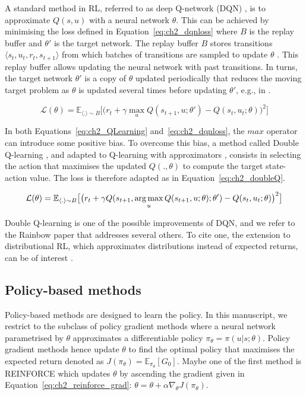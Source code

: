 A standard method in RL, referred to as deep Q-network (DQN) \citep{Mnih2015}, is to approximate $Q(s, u)$ with a neural network $\theta$.
This can be achieved by minimising the loss defined in Equation~\ref{eq:ch2_dqnloss} where $B$ is the replay buffer and $\theta'$ is the target network.
The replay buffer $B$ stores transitions $\langle s_{t},u_{t},r_{t},s_{t+1}\rangle$ from which batches of transitions are sampled to update $\theta$ \citep{lin1992self}.
This replay buffer allows updating the neural network with past transitions.
In turns, the target network $\theta'$ is a copy of $\theta$ updated periodically that reduces the moving target problem as $\theta$ is updated several times before updating $\theta'$, e.g., in \citep{Mnih2015}.

\begin{equation}
\label{eq:ch2_dqnloss}
    \mathcal{L}(\theta) = \mathbb{E}_{\langle . \rangle\sim B} \big[\big(r_{t} + \gamma \max_u Q(s_{t+1}, u; \theta')- Q(s_{t}, u_{t}; \theta)\big)^{2}\big]
\end{equation}

In both Equations~\ref{eq:ch2_QLearning} and~\ref{eq:ch2_dqnloss}, the $max$ operator can introduce some positive bias. 
To overcome this bias, a method called Double Q-learning \citep{hasselt2010double}, and adapted to Q-learning with approximators \citep{van2016deep}, consists in selecting the action that maximises the updated $Q(., \theta)$ to compute the target state-action value.
The loss is therefore adapted as in Equation~\ref{eq:ch2_doubleQ}.

\begin{equation}
    \label{eq:ch2_doubleQ}
    \mathcal{L}(\theta) = \mathbb{E}_{\langle . \rangle\sim B} \big[\big(r_{t} + \gamma Q(s_{t+1}, \operatorname*{arg\,max}_u Q(s_{t+1}, u;\theta) ; \theta')- Q(s_{t}, u_{t}; \theta)\big)^{2}\big]
\end{equation}

Double Q-learning is one of the possible improvements of DQN, and we refer to the Rainbow paper \citep{hessel2018rainbow} that addresses several others.
To cite one, the extension to distributional RL, which approximates distributions instead of expected returns, can be of interest \citep{bellemare2017distributional, THEATE2023199}. 

\subsection{Policy-based methods} \label{sec:ch2_policy_based_methods}
Policy-based methods are designed to learn the policy.
In this manuscript, we restrict to the subclass of policy gradient methods where a neural network parametrised by $\theta$ approximates a differentiable policy $\pi_\theta=\pi(u|s;\theta)$.
Policy gradient methods hence update $\theta$ to find the optimal policy that maximises the expected return denoted as  $J(\pi_\theta) = \mathbb{E}_{\pi_\theta}[G_0]$.
Maybe one of the first method is REINFORCE \citep{williams1992simple} which updates $\theta$  by ascending the gradient given in Equation~\ref{eq:ch2_reinforce_grad}: $\theta = \theta + \alpha \nabla_\theta J(\pi_\theta)$.

